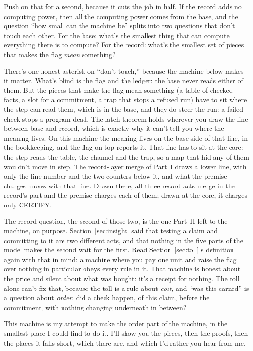 \documentclass[11pt,twoside]{article}
\theoremstyle{thielethm}
\theoremstyle{thieledef}
\theoremstyle{thieledef}
\theoremstyle{thieledef}
\theoremstyle{thielethm}
\theoremstyle{thieleobs}
\theoremstyle{thielethm}
\begin{document}
Push on that for a second, because it cuts the job in half. If the record adds no computing
power, then all the computing power comes from the base, and the question ``how small can
the machine be'' splits into two questions that don't touch each other. For the base: what's
the smallest thing that can compute everything there is to compute? For the record: what's
the smallest set of pieces that makes the flag \emph{mean} something?

There's one honest asterisk on ``don't touch,'' because the machine below makes it matter. What's
blind is the flag and the ledger: the base never reads either of them. But the pieces that
make the flag mean something (a table of checked facts, a slot for a commitment, a trap that
stops a refused run) have to sit where the step can read them, which is in the base, and they
do steer the run: a failed check stops a program dead. The latch theorem holds wherever you
draw the line between base and record, which is exactly why it can't tell you where the
meaning lives. On this machine the meaning lives on the base side of that line, in the bookkeeping, and the flag on top reports it. That line has to sit at the core: the step reads the table, the channel and the trap, so a map that hid any of them wouldn't move in step. The record-layer merge of Part~I draws a lower line, with only the line number and the two counters below it, and what the premise charges moves with that line. Drawn there, all three record acts merge in the record's part and the premise charges each of them; drawn at the core, it charges only CERTIFY.

The record question, the second of those two, is the one Part~II left to the machine, on purpose. Section~\ref{sec:insight} said that
testing a claim and committing to it are two different acts, and that nothing in the five
parts of the model makes the second wait for the first. Read Section~\ref{sec:toll}'s definition again with that
in mind: a machine where you pay one unit and raise the flag over nothing in particular
obeys every rule in it. That machine is honest about the price and silent about what was
bought: it's a receipt for nothing. The toll alone can't fix that, because the toll is a rule
about \emph{cost}, and ``was this earned'' is a question about \emph{order}: did a check happen, of
this claim, before the commitment, with nothing changing underneath in between?

This machine is my attempt to make the order part of the machine, in the smallest place I
could find to do it. I'll show you the pieces, then the proofs, then the places it falls
short, which there are, and which I'd rather you hear from me.
\end{document}
